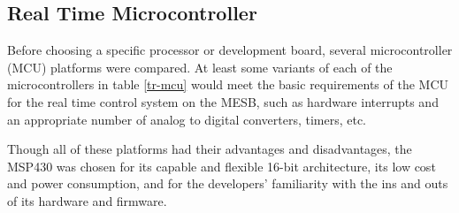 \documentclass[titlepage, letterpaper,12pt]{article}
\begin{document}
\subsection{Real Time Microcontroller}
Before choosing a specific processor or development board, several microcontroller (MCU) platforms were compared. At least some variants of each of the microcontrollers in table \ref{tr-mcu} would meet the basic requirements of the MCU for the real time control system on the MESB, such as hardware interrupts and an appropriate number of analog to digital converters, timers, etc.
\begin{table}[!htbp]
\caption{Real Time Microcontroller Trade Study}
\label{tr-mcu}
\end{table}
Though all of these platforms had their advantages and disadvantages, the MSP430 was chosen for its capable and flexible 16-bit architecture, its low cost and power consumption, and for the developers' familiarity with the ins and outs of its hardware and firmware.
\end{document}
